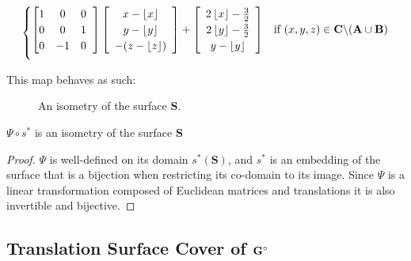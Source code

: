 \documentclass[]{article}
\begin{document}
\begin{Def}
\begin{equation}
\begin{cases}
		\left[ \begin{matrix}
		1 & 0 & 0 \\
		0 & 0 & 1 \\
		0 & -1 & 0
		\end{matrix}\hspace{2mm}\right]
		\left[\begin{array}{c}
			x - \left\lfloor x \right\rfloor
			\\ y- \left\lfloor y \right\rfloor
			\\ -(z - \left\lfloor z \right\rfloor)
			\end{array} \right]
		+
			\left[\begin{array}{c}
				2 \left\lfloor x \right\rfloor - \frac{3}{2}
				\\ 2\left\lfloor y \right\rfloor - \frac{3}{2}
				\\ y - \left\lfloor y \right\rfloor
			\end{array} \right]
				& \text{if } (x,y,z)\in \mathbf{C}\backslash(\mathbf{A}\cup\mathbf{B})	\vspace{2mm}
\end{cases}
\end{equation}
\end{Def}
\noindent This map behaves as such:
\begin{figure}[H]
\centering
 \hspace{0.1in}\raisebox{1.0in}{\text{$\rightarrow$}}\hspace{0.1in}
\raisebox{0.4in}{}
\caption{An isometry of the surface $\mathbf{S}$.}
\label{fig:Psi}
\end{figure}

\begin{lem}
$\Psi\circ s^*$ is an isometry of the surface $\mathbf{S}$
\begin{proof}
$\Psi$ is well-defined on its domain $s^*(\mathbf{S})$, and $s^*$ is an embedding of the surface that is a bijection when restricting its co-domain to its image. Since $\Psi$ is a linear transformation composed of Euclidean matrices and translations it is also invertible and bijective. 
\end{proof}
\end{lem}

\subsection{Translation Surface Cover of $\mathbf{G}^\circ$}
\end{document}
